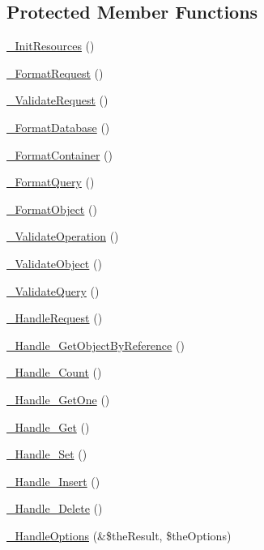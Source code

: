 \subsection*{Protected Member Functions}
\begin{DoxyCompactItemize}
\item 
\hyperlink{class_c_mongo_data_wrapper_a33ff97c26b97d00a67f97d41f67ce47b}{\-\_\-\-Init\-Resources} ()
\item 
\hyperlink{class_c_mongo_data_wrapper_abbc0d41394dda4a27eefa8481065749a}{\-\_\-\-Format\-Request} ()
\item 
\hyperlink{class_c_mongo_data_wrapper_a3d06376cb588e5c26751bff3f0083ef5}{\-\_\-\-Validate\-Request} ()
\item 
\hyperlink{class_c_mongo_data_wrapper_a15b44586fe5de968efb0edbe96f3da60}{\-\_\-\-Format\-Database} ()
\item 
\hyperlink{class_c_mongo_data_wrapper_a117d32ff4a01a54a7ff6203ba0ca66b7}{\-\_\-\-Format\-Container} ()
\item 
\hyperlink{class_c_mongo_data_wrapper_a807db77c3c4f7708e86873a0447b83ff}{\-\_\-\-Format\-Query} ()
\item 
\hyperlink{class_c_mongo_data_wrapper_a2642638da121e471c7ea1fbb61f6f3ef}{\-\_\-\-Format\-Object} ()
\item 
\hyperlink{class_c_mongo_data_wrapper_a406b81115b5f3957e6d40ee49ae85a13}{\-\_\-\-Validate\-Operation} ()
\item 
\hyperlink{class_c_mongo_data_wrapper_a9bb974219920f005b1cdba39793b84d5}{\-\_\-\-Validate\-Object} ()
\item 
\hyperlink{class_c_mongo_data_wrapper_aa2ae2292a247d94c9b1dfa13d9a4fb85}{\-\_\-\-Validate\-Query} ()
\item 
\hyperlink{class_c_mongo_data_wrapper_a811af7e7574a459bc56afa3afa99e1a8}{\-\_\-\-Handle\-Request} ()
\item 
\hyperlink{class_c_mongo_data_wrapper_a226970d3cfb96f8e85e46d3943c25089}{\-\_\-\-Handle\-\_\-\-Get\-Object\-By\-Reference} ()
\item 
\hyperlink{class_c_mongo_data_wrapper_ae7cc52809c8b6cea94c84d5f64a4308b}{\-\_\-\-Handle\-\_\-\-Count} ()
\item 
\hyperlink{class_c_mongo_data_wrapper_a3b9896d121c899aa3dd9f5e56e44c874}{\-\_\-\-Handle\-\_\-\-Get\-One} ()
\item 
\hyperlink{class_c_mongo_data_wrapper_a157a45bd4a2da43bd05d62b22faf3dc6}{\-\_\-\-Handle\-\_\-\-Get} ()
\item 
\hyperlink{class_c_mongo_data_wrapper_a3b59e4f2efbe64568c500756a170af29}{\-\_\-\-Handle\-\_\-\-Set} ()
\item 
\hyperlink{class_c_mongo_data_wrapper_adc1ef56d8c5fe9dbab74a821f38fe62c}{\-\_\-\-Handle\-\_\-\-Insert} ()
\item 
\hyperlink{class_c_mongo_data_wrapper_aaed227073838fb79b344e3d07a3152e8}{\-\_\-\-Handle\-\_\-\-Delete} ()
\item 
\hyperlink{class_c_mongo_data_wrapper_ac154306e6919de8316ddf45fc8d619f3}{\-\_\-\-Handle\-Options} (\&\$the\-Result, \$the\-Options)
\end{DoxyCompactItemize}



